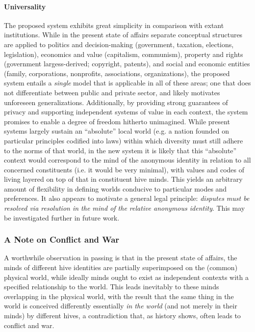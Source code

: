 \documentclass[pra,twocolumn,groupedaddress,10pt]{revtex4}
\theoremstyle{definition}
\begin{document}
\paragraph{Universality} The proposed system exhibits great simplicity in comparison with extant institutions. While in the present state of affairs separate conceptual structures are applied to politics and decision-making (government, taxation, elections, legislation), economics and value (capitalism, communism), property and rights (government largess-derived; copyright, patents), and social and economic entities (family, corporations, nonprofits, associations, organizations), the proposed system entails a \textit{single} model that is applicable in all of these areas; one that does not differentiate between public and private sector, and likely motivates unforeseen generalizations. Additionally, by providing strong guarantees of privacy and supporting independent systems of value in each context, the system promises to enable a degree of freedom hitherto unimagined. While present systems largely sustain an ``absolute'' local world (e.g. a nation founded on particular principles codified into laws) within which diversity must still adhere to the norms of that world, in the new system it is likely that this ``absolute'' context would correspond to the mind of the anonymous identity in relation to all concerned constituents (i.e. it would be very minimal), with values and codes of living layered on top of that in constituent hive minds. This yields an arbitrary amount of flexibility in defining worlds conducive to particular modes and preferences. It also appears to motivate a general legal principle: \textit{disputes must be resolved via resolution in the mind of the relative anonymous identity}. This may be investigated further in future work.

\subsubsection{A Note on Conflict and War}

A worthwhile observation in passing is that in the present state of affairs, the minds of different hive identities are partially superimposed on the (common) physical world, while ideally minds ought to exist as independent contexts with a specified relationship to the world. This leads inevitably to these minds overlapping in the physical world, with the result that the same thing in the world is conceived differently essentially \textit{in the world} (and not merely in their minds) by different hives, a contradiction that, as history shows, often leads to conflict and war.
\end{document}
